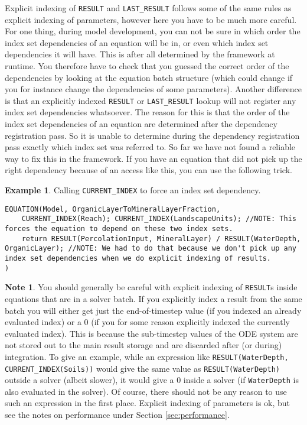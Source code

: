 \documentclass[11pt]{article}
\theoremstyle{definition}
\newtheorem{mynote}{Note}
\newenvironment{note}%
  {\begin{lrbox}{\notebox}%
   \begin{minipage}{\dimexpr\linewidth-2\fboxsep}
   \begin{mynote}}%
  {\end{mynote}%
   \end{minipage}%
   \end{lrbox}%
   \begin{trivlist}
     \item[]\colorbox{silver}{\usebox\notebox}
   \end{trivlist}}
\newtheorem{myexample}{Example}
\newenvironment{example}%
  {\begin{lrbox}{\examplebox}%
   \begin{minipage}{\dimexpr\linewidth-2\fboxsep}
   \begin{myexample}}%
  {\end{myexample}%
   \end{minipage}%
   \end{lrbox}%
   \begin{trivlist}
     \item[]\colorbox{silver}{\usebox\examplebox}
   \end{trivlist}}
\begin{document}
Explicit indexing of {\tt RESULT} and {\tt LAST\_RESULT} follows some of the same rules as explicit indexing of parameters, however here you have to be much more careful. For one thing, during model development, you can not be sure in which order the index set dependencies of an equation will be in, or even which index set dependencies it will have. This is after all determined by the framework at runtime. You therefore have to check that you guessed the correct order of the dependencies by looking at the equation batch structure (which could change if you for instance change the dependencies of some parameters). Another difference is that an explicitly indexed {\tt RESULT} or {\tt LAST\_RESULT} lookup will not register any index set dependencies whatsoever. The reason for this is that the order of the index set dependencies of an equation are determined after the dependency registration pass. So it is unable to determine during the dependency registration pass exactly which index set was referred to. So far we have not found a reliable way to fix this in the framework. If you have an equation that did not pick up the right dependency because of an access like this, you can use the following trick.

\begin{example}
Calling {\tt CURRENT\_INDEX} to force an index set dependency.
\begin{lstlisting}[style=mycpp]
EQUATION(Model, OrganicLayerToMineralLayerFraction,
	CURRENT_INDEX(Reach); CURRENT_INDEX(LandscapeUnits); //NOTE: This forces the equation to depend on these two index sets.
	return RESULT(PercolationInput, MineralLayer) / RESULT(WaterDepth, OrganicLayer); //NOTE: We had to do that because we don't pick up any index set dependencies when we do explicit indexing of results.
)
\end{lstlisting}
\end{example}

\begin{note}
You should generally be careful with explicit indexing of {\tt RESULT}s inside equations that are in a solver batch. If you explicitly index a result from the same batch you will either get just the end-of-timestep value (if you indexed an already evaluated index) or a 0 (if you for some reason explicitly indexed the currently evaluated index). This is because the sub-timestep values of the ODE system are not stored out to the main result storage and are discarded after (or during) integration. To give an example, while an expression like {\tt RESULT(WaterDepth, CURRENT\_INDEX(Soils))} would give the same value as {\tt RESULT(WaterDepth)} outside a solver (albeit slower), it would give a 0 inside a solver (if {\tt WaterDepth} is also evaluated in the solver). Of course, there should not be any reason to use such an expression in the first place. Explicit indexing of parameters is ok, but see the notes on performance under Section \ref{sec:performance}.
\end{note}
\end{document}
